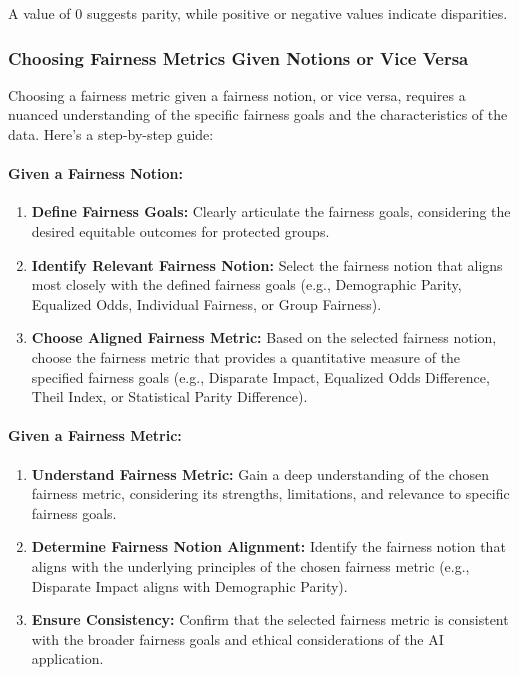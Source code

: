 A value of 0 suggests parity, while positive or negative values indicate disparities.

\subsubsection{Choosing Fairness Metrics Given Notions or Vice Versa}

Choosing a fairness metric given a fairness notion, or vice versa, requires a nuanced understanding of the specific fairness goals and the characteristics of the data. Here's a step-by-step guide:

\paragraph{Given a Fairness Notion:}

\begin{enumerate}
 
    \item \textbf{Define Fairness Goals:} Clearly articulate the fairness goals, considering the desired equitable outcomes for protected groups.
 
    \item \textbf{Identify Relevant Fairness Notion:} Select the fairness notion that aligns most closely with the defined fairness goals (e.g., Demographic Parity, Equalized Odds, Individual Fairness, or Group Fairness).
 
    \item \textbf{Choose Aligned Fairness Metric:} Based on the selected fairness notion, choose the fairness metric that provides a quantitative measure of the specified fairness goals (e.g., Disparate Impact, Equalized Odds Difference, Theil Index, or Statistical Parity Difference).

\end{enumerate}

\paragraph{Given a Fairness Metric:}

\begin{enumerate}

    \item \textbf{Understand Fairness Metric:} Gain a deep understanding of the chosen fairness metric, considering its strengths, limitations, and relevance to specific fairness goals.

    \item \textbf{Determine Fairness Notion Alignment:} Identify the fairness notion that aligns with the underlying principles of the chosen fairness metric (e.g., Disparate Impact aligns with Demographic Parity).
 
    \item \textbf{Ensure Consistency:} Confirm that the selected fairness metric is consistent with the broader fairness goals and ethical considerations of the AI application.

\end{enumerate}

